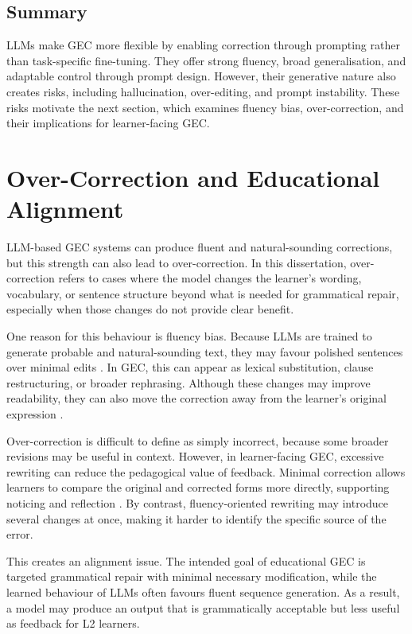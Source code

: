 \subsection*{Summary}

LLMs make GEC more flexible by enabling correction through prompting rather than task-specific fine-tuning. They offer strong fluency, broad generalisation, and adaptable control through prompt design. However, their generative nature also creates risks, including hallucination, over-editing, and prompt instability. These risks motivate the next section, which examines fluency bias, over-correction, and their implications for learner-facing GEC.

\section{Over-Correction and Educational Alignment}
\label{sec:over-correction}

LLM-based GEC systems can produce fluent and natural-sounding corrections, but this strength can also lead to over-correction. In this dissertation, over-correction refers to cases where the model changes the learner's wording, vocabulary, or sentence structure beyond what is needed for grammatical repair, especially when those changes do not provide clear benefit.

One reason for this behaviour is fluency bias. Because LLMs are trained to generate probable and natural-sounding text, they may favour polished sentences over minimal edits \cite{NEURIPS2020_1457c0d6,NIPS2017_3f5ee243}. In GEC, this can appear as lexical substitution, clause restructuring, or broader rephrasing. Although these changes may improve readability, they can also move the correction away from the learner's original expression \cite{loem2023exploringeffectivenessgpt3grammatical}.

Over-correction is difficult to define as simply incorrect, because some broader revisions may be useful in context. However, in learner-facing GEC, excessive rewriting can reduce the pedagogical value of feedback. Minimal correction allows learners to compare the original and corrected forms more directly, supporting noticing and reflection \cite{schmidt1990role}. By contrast, fluency-oriented rewriting may introduce several changes at once, making it harder to identify the specific source of the error.

This creates an alignment issue. The intended goal of educational GEC is targeted grammatical repair with minimal necessary modification, while the learned behaviour of LLMs often favours fluent sequence generation. As a result, a model may produce an output that is grammatically acceptable but less useful as feedback for L2 learners.

